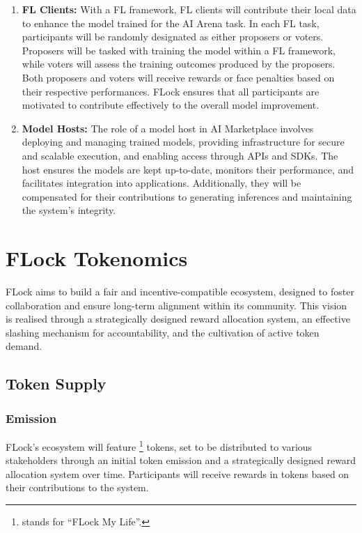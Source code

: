 \documentclass[conference]{IEEEtran}
\begin{document}
\begin{enumerate}
    \item \textbf{FL Clients:} With a FL framework, FL clients will contribute their local data to enhance the model trained for the AI Arena task. In each FL task, participants will be randomly designated as either proposers or voters. Proposers will be tasked with training the model within a FL framework, while voters will assess the training outcomes produced by the proposers. Both proposers and voters will receive rewards or face penalties based on their respective performances. FLock ensures that all participants are motivated to contribute effectively to the overall model improvement.


    \item \textbf{Model Hosts:} The role of a model host in AI Marketplace involves deploying and managing trained models, providing infrastructure for secure and scalable execution, and enabling access through APIs and SDKs. The host ensures the models are kept up-to-date, monitors their performance, and facilitates integration into applications. Additionally, they will be compensated for their contributions to generating inferences and maintaining the system's integrity.
\end{enumerate}



\section{FLock Tokenomics}
FLock aims to build a fair and incentive-compatible ecosystem, designed to foster collaboration and ensure long-term alignment within its community. This vision is realised through a strategically designed reward allocation system, an effective slashing mechanism for accountability, and the cultivation of active token demand. 


\subsection{Token Supply}

\subsubsection{Emission}
FLock's ecosystem will feature \FML\footnote{\FML stands for ``FLock My Life''.} tokens, set to be distributed to various stakeholders through an initial token emission and a strategically designed reward allocation system over time. Participants will receive rewards in \FML tokens based on their contributions to the system.
\end{document}
